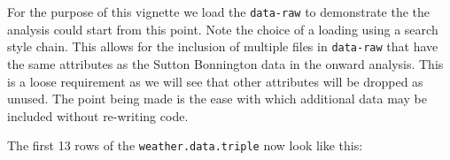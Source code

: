 \documentclass{article}
\newenvironment{Shaded}{\begin{snugshade}}{\end{snugshade}}
\newcommand{\AttributeTok}[1]{\textcolor[rgb]{0.77,0.63,0.00}{#1}}
\newcommand{\CommentTok}[1]{\textcolor[rgb]{0.56,0.35,0.01}{\textit{#1}}}
\newcommand{\ConstantTok}[1]{\textcolor[rgb]{0.00,0.00,0.00}{#1}}
\newcommand{\FunctionTok}[1]{\textcolor[rgb]{0.00,0.00,0.00}{#1}}
\newcommand{\NormalTok}[1]{#1}
\newcommand{\OtherTok}[1]{\textcolor[rgb]{0.56,0.35,0.01}{#1}}
\newcommand{\SpecialCharTok}[1]{\textcolor[rgb]{0.00,0.00,0.00}{#1}}
\newcommand{\StringTok}[1]{\textcolor[rgb]{0.31,0.60,0.02}{#1}}
\begin{document}
For the purpose of this vignette we load the \texttt{data-raw} to demonstrate the the analysis could start from this point. Note the choice of a loading using a search style chain. This allows for the inclusion of multiple files in \texttt{data-raw} that have the same attributes as the Sutton Bonnington data in the onward analysis. This is a loose requirement as we will see that other attributes will be dropped as unused. The point being made is the ease with which additional data may be included without re-writing code.

\begin{Shaded}
\end{Shaded}

The first 13 rows of the \texttt{weather.data.triple} now look like this:
\end{document}
